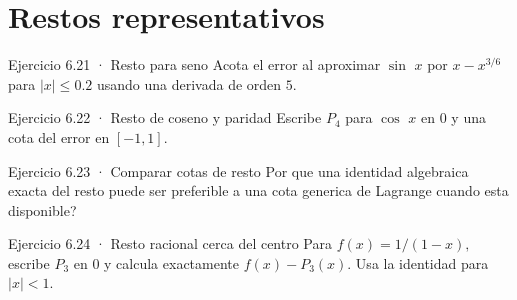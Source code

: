 \documentclass[10pt,a4paper,oneside,openany]{book}
\begin{document}
\section{Restos representativos}
\begin{PSevenExerciseFixed}{Ejercicio 6.21 · Resto para seno}
Acota el error al aproximar \(\sin\) \(x\) por \(x-x^{3/6}\) para \(|x|\le 0.2\) usando una derivada de orden \(5\).
\end{PSevenExerciseFixed}
\begin{PSevenExerciseFixed}{Ejercicio 6.22 · Resto de coseno y paridad}
Escribe \(P_4\) para \(\cos\) \(x\) en \(0\) y una cota del error en \([-1,1]\).
\end{PSevenExerciseFixed}
\begin{PSevenExerciseFixed}{Ejercicio 6.23 · Comparar cotas de resto}
Por que una identidad algebraica exacta del resto puede ser preferible a una cota generica de Lagrange cuando esta disponible?
\end{PSevenExerciseFixed}
\begin{PSevenExerciseFixed}{Ejercicio 6.24 · Resto racional cerca del centro}
Para \(f(x)=1/(1-x),\) escribe \(P_3\) en \(0\) y calcula exactamente \(f(x)-P_3(x)\). Usa la identidad para \(|x|<1\).
\end{PSevenExerciseFixed}
\end{document}
